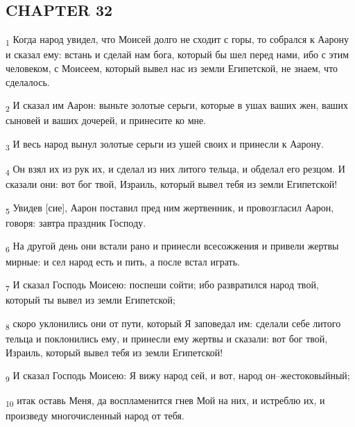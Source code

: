 \subsection{CHAPTER 32}
\begin{tcolorbox}
\textsubscript{1} Когда народ увидел, что Моисей долго не сходит с горы, то собрался к Аарону и сказал ему: встань и сделай нам бога, который бы шел перед нами, ибо с этим человеком, с Моисеем, который вывел нас из земли Египетской, не знаем, что сделалось.
\end{tcolorbox}
\begin{tcolorbox}
\textsubscript{2} И сказал им Аарон: выньте золотые серьги, которые в ушах ваших жен, ваших сыновей и ваших дочерей, и принесите ко мне.
\end{tcolorbox}
\begin{tcolorbox}
\textsubscript{3} И весь народ вынул золотые серьги из ушей своих и принесли к Аарону.
\end{tcolorbox}
\begin{tcolorbox}
\textsubscript{4} Он взял их из рук их, и сделал из них литого тельца, и обделал его резцом. И сказали они: вот бог твой, Израиль, который вывел тебя из земли Египетской!
\end{tcolorbox}
\begin{tcolorbox}
\textsubscript{5} Увидев [сие], Аарон поставил пред ним жертвенник, и провозгласил Аарон, говоря: завтра праздник Господу.
\end{tcolorbox}
\begin{tcolorbox}
\textsubscript{6} На другой день они встали рано и принесли всесожжения и привели жертвы мирные: и сел народ есть и пить, а после встал играть.
\end{tcolorbox}
\begin{tcolorbox}
\textsubscript{7} И сказал Господь Моисею: поспеши сойти; ибо развратился народ твой, который ты вывел из земли Египетской;
\end{tcolorbox}
\begin{tcolorbox}
\textsubscript{8} скоро уклонились они от пути, который Я заповедал им: сделали себе литого тельца и поклонились ему, и принесли ему жертвы и сказали: вот бог твой, Израиль, который вывел тебя из земли Египетской!
\end{tcolorbox}
\begin{tcolorbox}
\textsubscript{9} И сказал Господь Моисею: Я вижу народ сей, и вот, народ он--жестоковыйный;
\end{tcolorbox}
\begin{tcolorbox}
\textsubscript{10} итак оставь Меня, да воспламенится гнев Мой на них, и истреблю их, и произведу многочисленный народ от тебя.
\end{tcolorbox}
